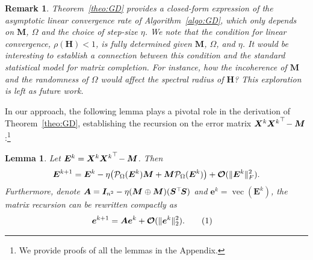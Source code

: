 \documentclass{article}
\def\P{{\cal P}}
\newtheorem{remark}{Remark}
\newtheorem{lemma}{Lemma}
\newcommand{\norm}[1]{\|#1\|} %
\newcommand\numberthis{\addtocounter{equation}{1}\tag{\theequation}}
\DeclareMathOperator*{\vect}{vec}
\newcommand{\topnew}{\top \hspace{-0.05cm}}
\begin{document}
\begin{remark}
Theorem~\ref{theo:GD} provides a closed-form expression of the asymptotic linear convergence rate of Algorithm~\ref{algo:GD}, which only depends on $\bm M$, $\Omega$ and the choice of step-size $\eta$. 
We note that the condition for linear convergence, $\rho(\bm H)<1$, is fully determined given $\bm M$, $\Omega$, and $\eta$. 
It would be interesting to establish a connection between this condition and the standard statistical model for matrix completion. For instance, how the incoherence of $\bm M$ and the randomness of $\Omega$ would affect the spectral radius of $\bm H$? 
This exploration is left as future work.
\end{remark}

In our approach, the following lemma plays a pivotal role in the derivation of Theorem~\ref{theo:GD}, establishing the recursion on the error matrix $\bm X^k {\bm X^k}^\topnew - \bm M$:\footnote{We provide proofs of all the lemmas in the Appendix.}

\begin{lemma} \label{lem:EA}
Let $\bm E^k = \bm X^k {\bm X^k}^\topnew - \bm M$. Then
\begin{align*}
    \bm E^{k+1} = \bm E^k - \eta \bigl( \P_\Omega (\bm E^k) \bm M + \bm M \P_\Omega (\bm E^k) \bigr) + \bm{\mathcal{O}}(\norm{\bm E^k}_F^2) .
\end{align*}
Furthermore, denote $\bm A = \bm I_{n^2} - \eta (\bm M \oplus \bm M) (\bm S^\topnew \bm S)$ and $\bm e^k = \vect(\bm E^k)$, the matrix recursion can be rewritten compactly as
\begin{align*}
    \bm e^{k+1} & = \bm A \bm e^k + \bm{\mathcal{O}}(\norm{\bm e^k}_2^2) . \numberthis \label{equ:E4}
\end{align*}
\end{lemma}
\end{document}
